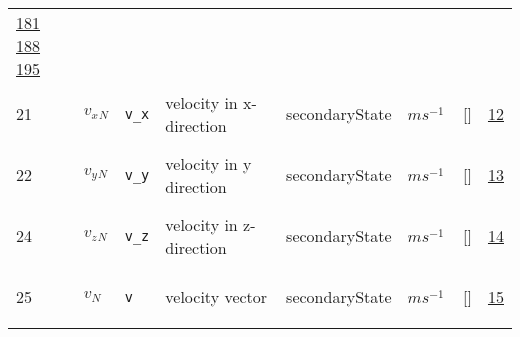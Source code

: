 \begin{longtable}{|p{1cm}|p{3cm}|p{3cm}|p{7cm}|p{3.0cm}|p{3cm}|p{2cm}|p{1cm}|}
                 \hyperlink{"e:181"}{ 181 }
                 \hyperlink{"e:188"}{ 188 }
                 \hyperlink{"e:195"}{ 195 }
                 \\
    21
             & \hypertarget{"v:21"}{ $ {v_x}{_{N}} $}
             & \verb|v_x|
             & velocity in x-direction
             & \begin{lay}secondaryState \end{lay}
             & $ m s^{-1} \, $
             & []
             & \hyperlink{"e:12"}{ 12 }
                 \\
    22
             & \hypertarget{"v:22"}{ $ {v_y}{_{N}} $}
             & \verb|v_y|
             & velocity in y direction
             & \begin{lay}secondaryState \end{lay}
             & $ m s^{-1} \, $
             & []
             & \hyperlink{"e:13"}{ 13 }
                 \\
    24
             & \hypertarget{"v:24"}{ $ {v_z}{_{N}} $}
             & \verb|v_z|
             & velocity in z-direction
             & \begin{lay}secondaryState \end{lay}
             & $ m s^{-1} \, $
             & []
             & \hyperlink{"e:14"}{ 14 }
                 \\
    25
             & \hypertarget{"v:25"}{ $ {v}{_{N}} $}
             & \verb|v|
             & velocity vector
             & \begin{lay}secondaryState \end{lay}
             & $ m s^{-1} \, $
             & []
             & \hyperlink{"e:15"}{ 15 }
                 \\
    \end{longtable}